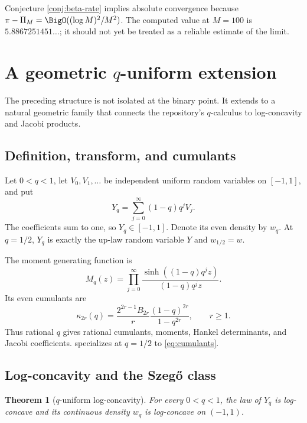 \documentclass[11pt,oneside]{article}
\newtheorem{theorem}{Theorem}[section]
\theoremstyle{definition}
\theoremstyle{remark}
\numberwithin{equation}{section}
\begin{document}
Conjecture \ref{conj:beta-rate} implies absolute convergence because
$\pi-\Pi_M=\BigO((\log M)^2/M^2)$.  The computed value at $M=100$ is
$5.8867251451\ldots$; it should not yet be treated as a reliable estimate of
the limit.

\section{A geometric \texorpdfstring{$q$}{q}-uniform extension}
\label{sec:q-family}

The preceding structure is not isolated at the binary point.  It extends to a
natural geometric family that connects the repository's $q$-calculus to
log-concavity and Jacobi products.

\subsection{Definition, transform, and cumulants}
Let $0<q<1$, let $V_0,V_1,\ldots$ be independent uniform random variables on
$[-1,1]$, and put
\begin{equation}
 Y_q=\sum_{j=0}^{\infty}(1-q)q^jV_j.
 \label{eq:q-uniform-series}
\end{equation}
The coefficients sum to one, so $Y_q\in[-1,1]$.  Denote its even density by
$w_q$.  At $q=1/2$, $Y_q$ is exactly the up-law random variable $Y$ and
$w_{1/2}=w$.

The moment generating function is
\begin{equation}
 M_q(z)=\prod_{j=0}^{\infty}
 \frac{\sinh((1-q)q^jz)}{(1-q)q^jz}.
 \label{eq:q-mgf}
\end{equation}
Its even cumulants are
\begin{equation}
 \boxed{
 \kappa_{2r}(q)=
 \frac{2^{2r-1}B_{2r}}{r}
 \frac{(1-q)^{2r}}{1-q^{2r}},
 \qquad r\ge1.}
 \label{eq:q-cumulants}
\end{equation}
Thus rational $q$ gives rational cumulants, moments, Hankel determinants, and
Jacobi coefficients.   specializes at $q=1/2$
to \cref{eq:cumulants}.

\subsection{Log-concavity and the Szeg\H{o} class}

\begin{theorem}[$q$-uniform log-concavity]
\label{thm:q-logconcavity}
For every $0<q<1$, the law of $Y_q$ is log-concave and its continuous density
$w_q$ is log-concave on $(-1,1)$.
\end{theorem}
\end{document}
